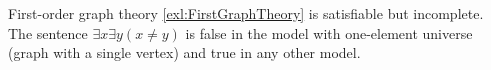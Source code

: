 

\setcounter{section}{3}
\setcounter{subsection}{1}
\setcounter{dfn}{8}

\begin{exl}
First-order graph theory \ref{exl:FirstGraphTheory} is satisfiable but incomplete.
The sentence $\exists x \exists y (x \ne y)$ is false in the model with one-element universe (graph with a single vertex) and true in any other model.
\end{exl}

